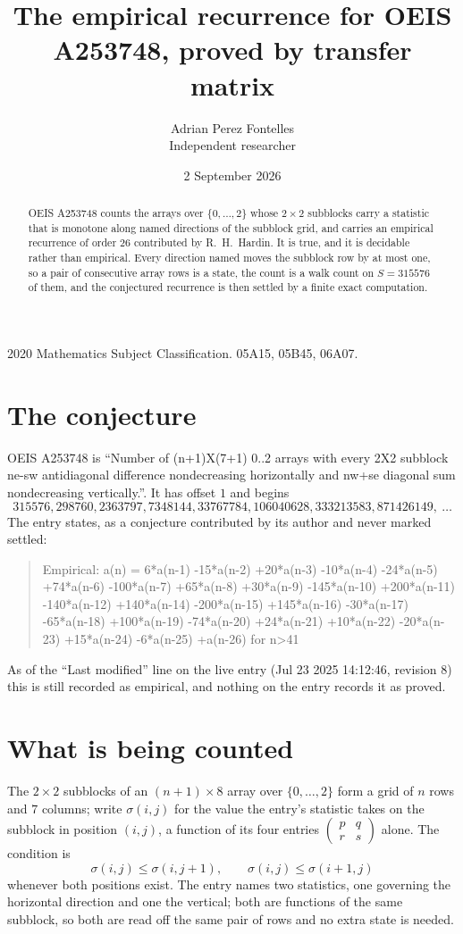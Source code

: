 \documentclass[11pt,a4paper]{article}
\title{The empirical recurrence for OEIS A253748, proved by transfer matrix}
\author{Adrian Perez Fontelles\\ \small Independent researcher}
\date{2 September 2026}
\theoremstyle{plain}
\theoremstyle{definition}
\begin{document}
\maketitle

\begin{abstract}
OEIS A253748 counts the arrays over $\{0,\dots,2\}$ whose $2\times2$ subblocks carry a
statistic that is monotone along named directions of the subblock grid, and carries an
empirical recurrence of order $26$ contributed by R.~H.~Hardin. It is true, and it is
decidable rather than empirical. Every direction named moves the subblock row by at most one,
so a pair of consecutive array rows is a state, the count is a walk count on $S=315576$ of them,
and the conjectured recurrence is then settled by a finite exact computation.
\end{abstract}

\noindent\small 2020 Mathematics Subject Classification. 05A15, 05B45, 06A07.\normalsize

\section{The conjecture}

OEIS A253748 is ``Number of (n+1)X(7+1) 0..2 arrays with every 2X2 subblock ne-sw antidiagonal difference nondecreasing horizontally and nw+se diagonal sum nondecreasing vertically.''. It has offset $1$ and begins
\[
315576, 298760, 2363797, 7348144, 33767784, 106040628, 333213583, 871426149,\ \dots
\]
The entry states, as a conjecture contributed by its author and never marked settled:
\begin{quote}
Empirical: a(n) = 6*a(n-1) -15*a(n-2) +20*a(n-3) -10*a(n-4) -24*a(n-5) +74*a(n-6) -100*a(n-7) +65*a(n-8) +30*a(n-9) -145*a(n-10) +200*a(n-11) -140*a(n-12) +140*a(n-14) -200*a(n-15) +145*a(n-16) -30*a(n-17) -65*a(n-18) +100*a(n-19) -74*a(n-20) +24*a(n-21) +10*a(n-22) -20*a(n-23) +15*a(n-24) -6*a(n-25) +a(n-26) for n>41
\end{quote}
As of the ``Last modified'' line on the live entry (Jul 23 2025 14:12:46, revision 8) this is still
recorded as empirical, and nothing on the entry records it as proved.

\section{What is being counted}

The $2\times2$ subblocks of an $(n+1)\times8$ array over $\{0,\dots,2\}$ form a grid
of $n$ rows and $7$ columns; write $\sigma(i,j)$ for the value the entry's statistic takes on
the subblock in position $(i,j)$, a function of its four entries
$\begin{pmatrix}p&q\\r&s\end{pmatrix}$ alone. The condition is
\[
\sigma(i,j)\le\sigma(i,j+1),\qquad \sigma(i,j)\le\sigma(i+1,j)
\]
whenever both positions exist. The entry names two statistics, one governing the horizontal direction and one the vertical; both are functions of the same subblock, so both are read off the same pair of rows and no extra state is needed.
\end{document}
